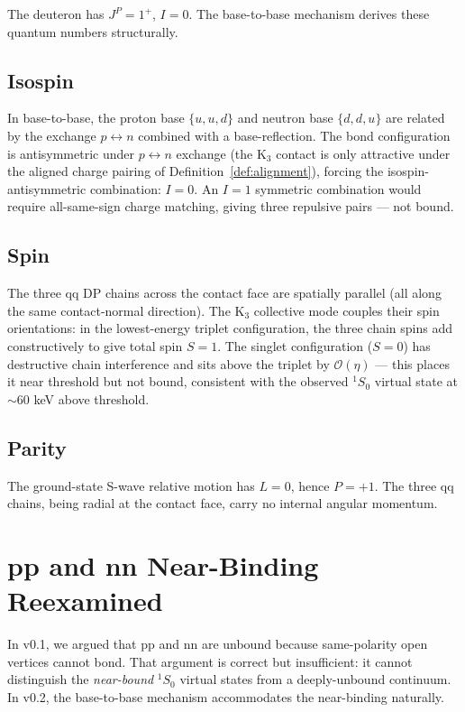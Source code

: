 \documentclass[11pt,letterpaper]{article}
\begin{document}
The deuteron has $J^P = 1^+$, $I = 0$. The base-to-base mechanism derives these quantum numbers structurally.

\subsection{Isospin}

In base-to-base, the proton base $\{u,u,d\}$ and neutron base $\{d,d,u\}$ are related by the exchange $p \leftrightarrow n$ combined with a base-reflection. The bond configuration is antisymmetric under $p \leftrightarrow n$ exchange (the K$_3$ contact is only attractive under the aligned charge pairing of Definition~\ref{def:alignment}), forcing the isospin-antisymmetric combination: $I = 0$. An $I = 1$ symmetric combination would require all-same-sign charge matching, giving three repulsive pairs --- not bound.

\subsection{Spin}

The three qq DP chains across the contact face are spatially parallel (all along the same contact-normal direction). The K$_3$ collective mode couples their spin orientations: in the lowest-energy triplet configuration, the three chain spins add constructively to give total spin $S = 1$. The singlet configuration ($S = 0$) has destructive chain interference and sits above the triplet by $\mathcal{O}(\eta)$ --- this places it near threshold but not bound, consistent with the observed $^{1}S_0$ virtual state at $\sim 60$ keV above threshold.

\subsection{Parity}

The ground-state S-wave relative motion has $L = 0$, hence $P = +1$. The three qq chains, being radial at the contact face, carry no internal angular momentum.

\section{pp and nn Near-Binding Reexamined}
\label{sec:pp_nn_revised}

In v0.1, we argued that pp and nn are unbound because same-polarity open vertices cannot bond. That argument is correct but insufficient: it cannot distinguish the \emph{near-bound} ${}^{1}S_{0}$ virtual states from a deeply-unbound continuum. In v0.2, the base-to-base mechanism accommodates the near-binding naturally.
\end{document}
